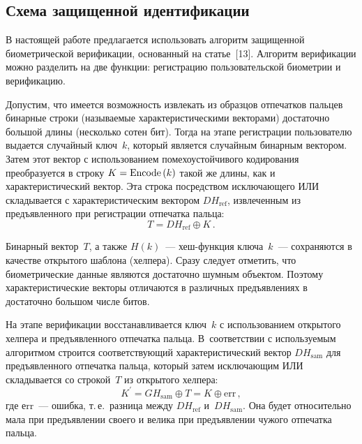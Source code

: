 \begin{multicols}{2}
\section{Схема защищенной идентификации}
      
      В настоящей работе предлагается использовать алгоритм защищенной 
биометрической верификации, основанный на статье~[13]. Алгоритм верификации можно 
разделить на две функции: регистрацию пользовательской биометрии и верификацию.
      
      Допустим, что имеется возможность извлекать из образцов отпечатков пальцев 
бинарные строки (называемые характеристическими векторами) достаточно большой 
длины (несколько сотен бит). Тогда на этапе регистрации пользователю выдается 
случайный ключ~$k$, который является случайным бинарным вектором. Затем этот 
вектор с использованием помехоустойчивого кодирования преобразуется в строку 
$K\hm=\mathrm{Encode}\left(k\right)$ такой же длины, как и характеристический вектор. Эта строка 
посредством исключающего ИЛИ складывается с характеристическим вектором 
$DH_{\mathrm{ref}}$, извлеченным из предъявленного при регистрации отпечатка \mbox{пальца}:
      \begin{equation*}
      T=DH_{\mathrm{ref}}\oplus K\,.
      \end{equation*}
      
      Бинарный вектор~$T$, а также $H(k)$~--- хеш-функ\-ция ключа~$k$~--- 
сохраняются в качестве открытого шаблона (хелпера). Сразу следует отметить, что 
биометрические данные являются достаточно шумным объектом. Поэтому 
характеристические векторы отличаются в различных предъявлениях в достаточно 
большом числе битов.
      
      На этапе верификации восстанавливается ключ~$k$ с использованием открытого 
хелпера и предъявленного отпечатка пальца. В~соответствии с используемым алгоритмом 
строится со\-от\-вет\-ст\-ву\-ющий характеристический вектор $DH_{\mathrm{sam}}$ для предъявленного 
отпечатка пальца, который затем исключающим ИЛИ складывается со строкой~$T$ из 
открытого хелпера:
      \begin{equation}
      K^\prime= GH_{\mathrm{sam}}\oplus T=K\oplus \mathrm{err}\,,
      \label{e2-usm}
      \end{equation}
где еrr~--- ошибка, т.\,е.\ разница между $DH_{\mathrm{ref}}$ и~$DH_{\mathrm{sam}}$. Она будет 
относительно мала при предъявлении своего и велика при предъявлении чужого отпечатка 
пальца.
      

\end{multicols}
